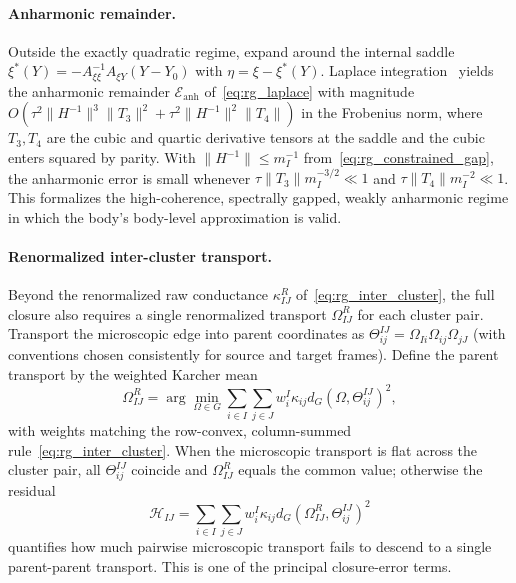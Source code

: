 \documentclass[11pt]{article}
\begin{document}
\paragraph{Anharmonic remainder.}
Outside the exactly quadratic regime, expand around the internal saddle $\xi^*(Y) = -A_{\xi\xi}^{-1}A_{\xi Y}(Y - Y_0)$ with $\eta = \xi - \xi^*(Y)$. Laplace integration~\cite{wong2001asymptotic} yields the anharmonic remainder $\mathcal{E}_{\mathrm{anh}}$ of~\eqref{eq:rg_laplace} with magnitude $O(\tau^2 \|H^{-1}\|^3 \|T_3\|^2 + \tau^2 \|H^{-1}\|^2 \|T_4\|)$ in the Frobenius norm, where $T_3, T_4$ are the cubic and quartic derivative tensors at the saddle and the cubic enters squared by parity. With $\|H^{-1}\| \le m_I^{-1}$ from~\eqref{eq:rg_constrained_gap}, the anharmonic error is small whenever $\tau \|T_3\| m_I^{-3/2} \ll 1$ and $\tau \|T_4\| m_I^{-2} \ll 1$. This formalizes the high-coherence, spectrally gapped, weakly anharmonic regime in which the body's body-level approximation is valid.

\paragraph{Renormalized inter-cluster transport.}
Beyond the renormalized raw conductance $\kappa_{IJ}^R$ of~\eqref{eq:rg_inter_cluster}, the full closure also requires a single renormalized transport $\Omega_{IJ}^R$ for each cluster pair. Transport the microscopic edge into parent coordinates as $\Theta_{ij}^{IJ} = \Omega_{Ii}\Omega_{ij}\Omega_{jJ}$ (with conventions chosen consistently for source and target frames). Define the parent transport by the weighted Karcher mean
\begin{equation}
\Omega_{IJ}^R = \arg\min_{\Omega \in G} \sum_{i \in I}\sum_{j \in J} w_i^I \kappa_{ij} d_G(\Omega, \Theta_{ij}^{IJ})^2,
\end{equation}
with weights matching the row-convex, column-summed rule~\eqref{eq:rg_inter_cluster}.
When the microscopic transport is flat across the cluster pair, all $\Theta_{ij}^{IJ}$ coincide and $\Omega_{IJ}^R$ equals the common value; otherwise the residual
\begin{equation}
\mathcal{H}_{IJ} = \sum_{i \in I}\sum_{j \in J} w_i^I \kappa_{ij} d_G(\Omega_{IJ}^R, \Theta_{ij}^{IJ})^2
\end{equation}
quantifies how much pairwise microscopic transport fails to descend to a single parent-parent transport. This is one of the principal closure-error terms.
\end{document}

